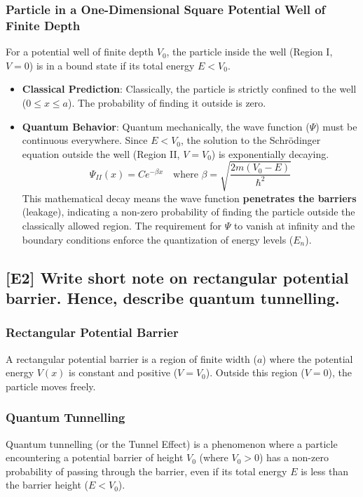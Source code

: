 \documentclass[12pt]{article}
\begin{document}
\subsubsection*{Particle in a One-Dimensional Square Potential Well of Finite Depth}
For a potential well of finite depth $V_0$, the particle inside the well (Region I, $V=0$) is in a bound state if its total energy $E < V_0$.

\begin{itemize}
    \item \textbf{Classical Prediction}: Classically, the particle is strictly confined to the well ($0 \le x \le a$). The probability of finding it outside is zero.
    \item \textbf{Quantum Behavior}: Quantum mechanically, the wave function ($\Psi$) must be continuous everywhere. Since $E < V_0$, the solution to the Schrödinger equation outside the well (Region II, $V=V_0$) is exponentially decaying.
    $$
    \Psi_{II}(x) = C e^{-\beta x} \quad \text{where } \beta = \sqrt{\frac{2m (V_0 - E)}{\hbar^2}}
    $$
    This mathematical decay means the wave function \textbf{penetrates the barriers} (leakage), indicating a non-zero probability of finding the particle outside the classically allowed region. The requirement for $\Psi$ to vanish at infinity and the boundary conditions enforce the quantization of energy levels ($E_n$).
\end{itemize}

\subsection{[E2] Write short note on rectangular potential barrier. Hence, describe quantum tunnelling.}

\subsubsection*{Rectangular Potential Barrier}
A rectangular potential barrier is a region of finite width ($a$) where the potential energy $V(x)$ is constant and positive ($V=V_0$). Outside this region ($V=0$), the particle moves freely.

\subsubsection*{Quantum Tunnelling}
Quantum tunnelling (or the Tunnel Effect) is a phenomenon where a particle encountering a potential barrier of height $V_0$ (where $V_0 > 0$) has a non-zero probability of passing through the barrier, even if its total energy $E$ is less than the barrier height ($E < V_0$).
\end{document}
